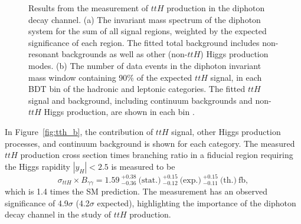 \documentclass{moriond}
\begin{document}
\begin{figure}[!htbp]
  \centering
  \caption{
    Results from the measurement of $ttH$ production in the diphoton decay channel.
    (a) The invariant mass spectrum of the diphoton system for the sum of all signal regions, weighted
    by the expected significance of each region. The fitted total background includes non-resonant
    backgrounds as well as other (non-$ttH$) Higgs production modes.
    (b) The number of data events in the diphoton invariant mass window containing 90\% of the expected
    $ttH$ signal, in each BDT bin of the hadronic and leptonic categories.
    The fitted $ttH$ signal and background, including continuum backgrounds and non-$ttH$ Higgs
    production, are shown in each bin \cite{ATLAS-CONF-2019-004}.
  }
  \label{fig:tth}
\end{figure}

In Figure~\ref{fig:tth_b}, the contribution of $ttH$ signal, other Higgs
production processes, and continuum background is shown for each category.
The measured $ttH$ production cross section times branching ratio in a fiducial region requiring the
Higgs rapidity $|y_H|<2.5$ is measured to be
%
\begin{equation}
\sigma_{ttH} \times B_{\gamma\gamma} = 1.59~^{+0.38}_{-0.36} ~\textrm{(stat.)}
~^{+0.15}_{-0.12} ~\textrm{(exp.)}
~^{+0.15}_{-0.11} ~\textrm{(th.)}~\textrm{fb},
\end{equation}
%
which is 1.4 times the SM prediction.
The measurement has an observed significance of 4.9$\sigma$ (4.2$\sigma$ expected),
highlighting the importance of the diphoton decay channel in the study of $ttH$ production.
\end{document}
